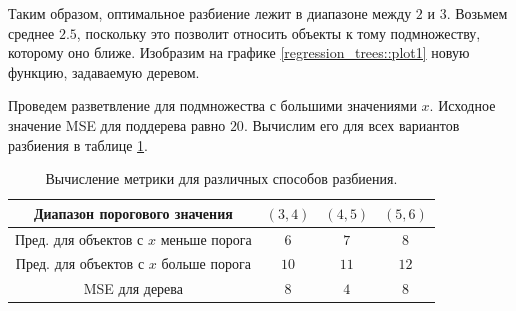 Таким образом, оптимальное разбиение лежит в диапазоне между $2$ и $3$. Возьмем среднее $2.5$, поскольку это позволит относить объекты к тому подмножеству, которому оно ближе. Изобразим на графике \ref{regression_trees::plot1} новую функцию, задаваемую деревом.

\begin{center}
    \label{regression_trees::plot1}
\end{center}

Проведем разветвление для подмножества с большими значениями $x$. Исходное значение MSE для поддерева равно $20$. Вычислим его для всех вариантов разбиения в таблице \ref{regression_trees::table2}.
\begin{table}[h]
    \centering
    \caption{Вычисление метрики для различных способов разбиения.}
    \begin{tabular}{|c|c|c|c|}
        \hline
        Диапазон порогового значения           & $(3, 4)$ & $(4, 5)$ & $(5, 6)$ \\
        \hline
        Пред. для объектов с $x$ меньше порога & $6$      & $7$      & $8$      \\
        \hline
        Пред. для объектов с $x$ больше порога & $10$     & $11$     & $12$     \\
        \hline
        MSE для дерева                         & $8$      & $4$      & $8$      \\
        \hline
    \end{tabular}
    \label{regression_trees::table2}
\end{table}

